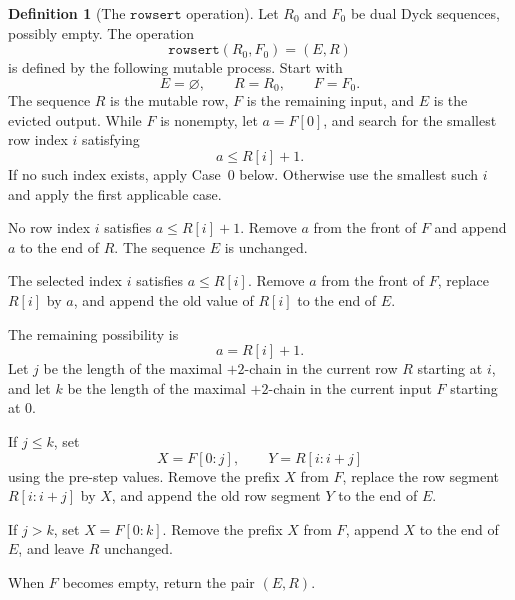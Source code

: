 \documentclass[11pt]{article}
\theoremstyle{plain}
\theoremstyle{definition}
\newtheorem{definition}[theorem]{Definition}
\theoremstyle{remark}
\newcommand{\rowsert}{\texttt{rowsert}}
\begin{document}
\begin{definition}[The \(\rowsert\) operation]
\label{def:rowsert}
Let \(R_0\) and \(F_0\) be dual Dyck sequences, possibly empty.  The operation
\[
  \rowsert(R_0,F_0)=(E,R)
\]
is defined by the following mutable process.  Start with
\[
  E=\varnothing,\qquad R=R_0,
  \qquad F=F_0.
\]
The sequence \(R\) is the mutable row, \(F\) is the remaining input, and \(E\)
is the evicted output.  While \(F\) is nonempty, let \(a=F[0]\), and search for
the smallest row index \(i\) satisfying
\[
  a\le R[i]+1.
\]
If no such index exists, apply Case~0 below.  Otherwise use the smallest such
\(i\) and apply the first applicable case.
\begin{description}[leftmargin=2.4cm,style=nextline]
\item[Case 0.] No row index \(i\) satisfies \(a\le R[i]+1\).  Remove \(a\) from
the front of \(F\) and append \(a\) to the end of \(R\).  The sequence \(E\) is
unchanged.
\item[Case 1.] The selected index \(i\) satisfies \(a\le R[i]\).  Remove \(a\)
from the front of \(F\), replace \(R[i]\) by \(a\), and append the old value of
\(R[i]\) to the end of \(E\).
\item[Equality branch.] The remaining possibility is
\[
  a=R[i]+1.
\]
Let \(j\) be the length of the maximal \(+2\)-chain in the current row \(R\)
starting at \(i\), and let \(k\) be the length of the maximal \(+2\)-chain in
the current input \(F\) starting at \(0\).
\item[Case 2.] If \(j\le k\), set
\[
  X=F[0:j],\qquad Y=R[i:i+j]
\]
using the pre-step values.  Remove the prefix \(X\) from \(F\), replace the row
segment \(R[i:i+j]\) by \(X\), and append the old row segment \(Y\) to the end
of \(E\).
\item[Case 3.] If \(j>k\), set \(X=F[0:k]\).  Remove the prefix \(X\) from
\(F\), append \(X\) to the end of \(E\), and leave \(R\) unchanged.
\end{description}
When \(F\) becomes empty, return the pair \((E,R)\).
\end{definition}
\end{document}
